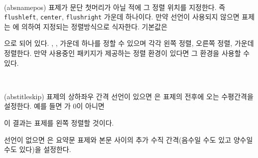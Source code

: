 \begin{syntax}
\cmd{\absnamepos} \\
\end{syntax}
\glossary(absnamepos)%
  {}%
  { 표제가 문단 첫머리가 아닐 적에 그 정렬 위치를 지정한다.
  즉 \texttt{flushleft}, \texttt{center}, \texttt{flushright} 가운데 하나이다.}
만약 \cmd{\abstractrunin} 선언이 사용되지 않으면 표제는 
\cmd{\absnamepos}에 의하여 지정되는 정렬방식으로 식자한다.
기본값은
\begin{lcode}
\newcommand{\absnamepos}{center}
\end{lcode}
으로 되어 있다.
, ,  가운데 하나를 정할 수 
있으며 각각 왼쪽 정렬, 오른쪽 정렬, 가운데 정렬한다.
만약 사용중인 패키지가 제공하는 정렬 환경이 있다면
그 환경을 사용할 수 있다.

\begin{syntax}
\lnc{\abstitleskip} \\
\end{syntax}
\glossary(abstitleskip)%
  {}
  { 표제의 상하좌우 간격}
\cmd{\abstractrunin} 선언이 있으면 \lnc{\abstitleskip}은 표제의
전후에 오는 수평간격을 설정한다. 예를 들면 \lnc{\apsparindent}가 $0$이 아니면
\begin{lcode}
\setlength{\abstitleskip}{-\absparindent}
\end{lcode}
이 결과는 표제를 왼쪽 정렬할 것이다.

\cmd{\abstractrunin} 선언이 없으면 \lnc{\abstitleskip}은
요약문 표제와 본문 사이의 추가 수직 간격(음수일 수도 있고 양수일 수도 있다)을
설정한다.
%
